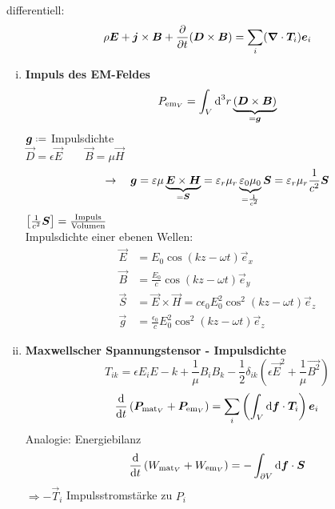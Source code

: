 \noindent
differentiell:
\begin{equation*}
\rho \bm{E} + \bm{j} \times \bm{B} + \frac{\partial }{\partial t} (\bm{D} \times \bm{B}) = \sum_i (\bm{\nabla} \cdot \bm{T}_i) \bm{e}_i
\end{equation*}
\begin{enumerate}[i)]
	\item \textbf{Impuls des EM-Feldes}
	\begin{equation*}
	P_{\textrm{em}_V} = \int_V \textrm{d}^3 r \underbrace{(\bm{D} \times \bm{B})}_{=\bm{g}}
	\end{equation*}
	$ \vec{g} \defeq $ Impulsdichte\\
	$ \vec{D} = \epsilon \vec{E} \qquad \vec{B} = \mu \vec{H} $
	\begin{equation*}
	\rightarrow \quad \bm{g} = \varepsilon \mu \underbrace{\bm{E} \times \bm{H}}_{=\bm{S}} = \varepsilon_r \mu_r \underbrace{\varepsilon_0 \mu_0}_{= \frac{1}{c^2}} \bm{S} = \varepsilon_r \mu_r \frac{1}{c^2} \bm{S}
	\end{equation*}
	$ \left[\frac{1}{c^2} \bm{S}\right] = \frac{\textrm{Impuls}}{\textrm{Volumen}} $\\[10pt]
	Impulsdichte einer ebenen Wellen:
	\begin{align*}
	\vec{E} &= E_0 \cos\left(kz - \omega t\right) \vec{e}_x\\
	\vec{B} &= \frac{E_0}{c} \cos\left(kz - \omega t\right) \vec{e}_y\\
	\vec{S} &= \vec{E} \times \vec{H} = c \epsilon_0 E_0^2 \cos^2(kz - \omega t) \vec{e}_z\\
	\vec{g} &= \frac{\epsilon_0}{c} E_0^2 \cos^2(kz - \omega t) \vec{e}_z
	\end{align*}
	\item \textbf{Maxwellscher Spannungstensor - Impulsdichte}
	\begin{equation*}
	T_{ik} = \epsilon E_i E-k + \frac{1}{\mu} B_i B_k - \frac{1}{2} \delta_{ik} \left(\epsilon \vec{E}^2 + \frac{1}{\mu} \vec{B^2}\right)
	\end{equation*}
	\begin{equation*}
	\frac{\textrm{d} }{\textrm{d} t} \left(\bm{P}_{\textrm{mat}_V} + \bm{P}_{\textrm{em}_V}\right) = \sum_i \left(\int_V \textrm{d}\bm{f} \cdot \bm{T}_i \right)\bm{e}_i
	\end{equation*}
	Analogie: Energiebilanz
	\begin{equation*}
	\frac{\textrm{d} }{\textrm{d} t} \left(W_{\textrm{mat}_V} + W_{\textrm{em}_V}\right) = - \int_{\partial V} \textrm{d} \bm{f} \cdot \bm{S}
	\end{equation*}
	$ \Rightarrow - \vec{T}_i $ Impulsstromstärke zu $ P_i $\\

\end{enumerate}
